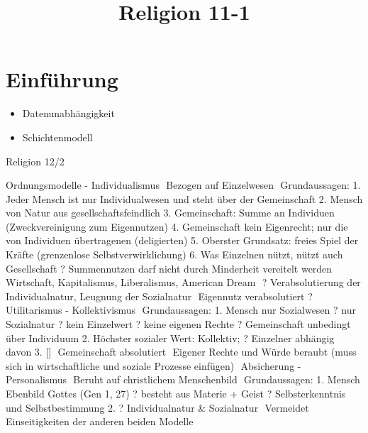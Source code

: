 \documentclass[11pt, paper=a4, twocolumn]{scrartcl}
\title{\vspace{-1.25cm}Religion 11-1\vspace{-0.25cm}}
\date{\vspace{-5ex}}
\begin{document}
	\maketitle


	\section{Einführung}
		\begin{itemize}
			\item Datenunabhängigkeit
			\item Schichtenmodell
		\end{itemize}


Religion 12/2
 
Ordnungsmodelle
-	Individualismus
	Bezogen auf Einzelwesen
	Grundaussagen:
1.	Jeder Mensch ist nur Individualwesen und steht über der Gemeinschaft
2.	Mensch von Natur aus gesellschaftsfeindlich
3.	Gemeinschaft: Summe an Individuen (Zweckvereinigung zum Eigennutzen)
4.	Gemeinschaft kein Eigenrecht; nur die von Individuen übertragenen (deligierten)
5.	Oberster Grundsatz: freies Spiel der Kräfte (grenzenlose Selbstverwirklichung)
6.	Was Einzelnen nützt, nützt auch Gesellschaft ? Summennutzen darf nicht durch Minderheit vereitelt werden
	Wirtschaft, Kapitalismus, Liberalismus, American Dream
	? Verabsolutierung der Individualnatur, Leugnung der Sozialnatur
	Eigennutz verabsolutiert ? Utilitarismus
-	Kollektivismus
	Grundaussagen:
1.	Mensch nur Sozialwesen ? nur Sozialnatur ? kein Einzelwert ? keine eigenen Rechte ? Gemeinschaft unbedingt über Individuum
2.	Höchster sozialer Wert: Kollektiv; ? Einzelner abhängig davon
3.	[]
	Gemeinschaft absolutiert
	Eigener Rechte und Würde beraubt (muss sich in wirtschaftliche und soziale Prozesse einfügen)
	Absicherung
-	Personalismus
	Beruht auf christlichem Menschenbild
	Grundaussagen:
1.	Mensch Ebenbild Gottes (Gen 1, 27) ? besteht aus Materie + Geist
? Selbsterkenntnis und Selbstbestimmung
2.	? Individualnatur & Sozialnatur
	Vermeidet Einseitigkeiten der anderen beiden Modelle
\end{document}
